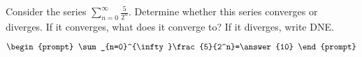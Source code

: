 \documentclass{ximera}
\author{Gregory Hartman \and Matthew Carr}
\begin{document}
\begin{exercise}




Consider the series $\sum_{n=0}^{\infty}\frac{5}{2^n}$. Determine whether this series converges or diverges. If it converges, what does it converge to? If it diverges, write DNE.

\[
\begin{prompt}
\sum_{n=0}^{\infty}\frac{5}{2^n}=\answer{10}
\end{prompt}
\]
\end{exercise}
\end{document}
